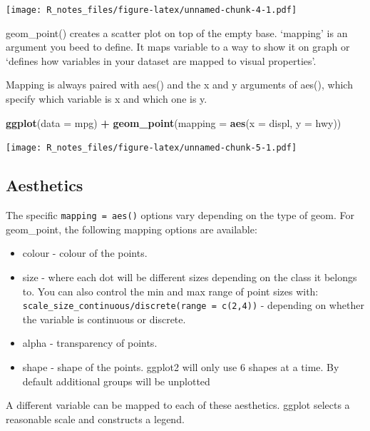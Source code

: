 \documentclass[]{book}
\newenvironment{Shaded}{\begin{snugshade}}{\end{snugshade}}
\newcommand{\KeywordTok}[1]{\textcolor[rgb]{0.13,0.29,0.53}{\textbf{#1}}}
\newcommand{\DataTypeTok}[1]{\textcolor[rgb]{0.13,0.29,0.53}{#1}}
\newcommand{\StringTok}[1]{\textcolor[rgb]{0.31,0.60,0.02}{#1}}
\newcommand{\OperatorTok}[1]{\textcolor[rgb]{0.81,0.36,0.00}{\textbf{#1}}}
\newcommand{\NormalTok}[1]{#1}
\providecommand{\tightlist}{%
  \setlength{\itemsep}{0pt}\setlength{\parskip}{0pt}}
\begin{document}
\texttt{[image: R\_notes\_files/figure-latex/unnamed-chunk-4-1.pdf]}

geom\_point() creates a scatter plot on top of the empty base. `mapping'
is an argument you beed to define. It maps variable to a way to show it
on graph or `defines how variables in your dataset are mapped to visual
properties'.

Mapping is always paired with aes() and the x and y arguments of aes(),
which specify which variable is x and which one is y.

\begin{Shaded}
\begin{Highlighting}[]
\KeywordTok{ggplot}\NormalTok{(}\DataTypeTok{data =}\NormalTok{ mpg) }\OperatorTok{+}\StringTok{ }
\StringTok{  }\KeywordTok{geom_point}\NormalTok{(}\DataTypeTok{mapping =} \KeywordTok{aes}\NormalTok{(}\DataTypeTok{x =}\NormalTok{ displ, }\DataTypeTok{y =}\NormalTok{ hwy))}
\end{Highlighting}
\end{Shaded}

\texttt{[image: R\_notes\_files/figure-latex/unnamed-chunk-5-1.pdf]}

\subsection{Aesthetics}\label{aesthetics}

The specific \texttt{mapping\ =\ aes()} options vary depending on the
type of geom. For geom\_point, the following mapping options are
available:

\begin{itemize}
\tightlist
\item
  colour - colour of the points.
\item
  size - where each dot will be different sizes depending on the class
  it belongs to. You can also control the min and max range of point
  sizes with:
  \texttt{scale\_size\_continuous/discrete(range\ =\ c(2,4))} -
  depending on whether the variable is continuous or discrete.
\item
  alpha - transparency of points.
\item
  shape - shape of the points. ggplot2 will only use 6 shapes at a time.
  By default additional groups will be unplotted
\end{itemize}

A different variable can be mapped to each of these aesthetics. ggplot
selects a reasonable scale and constructs a legend.
\end{document}

